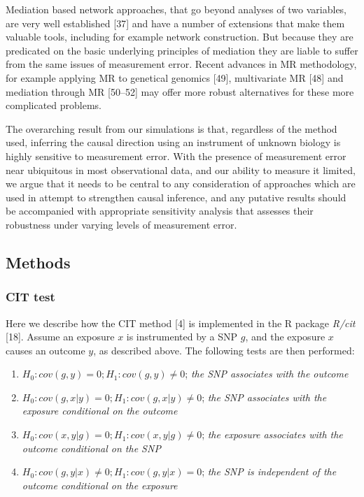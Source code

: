 \documentclass[]{article}
\providecommand{\tightlist}{%
  \setlength{\itemsep}{0pt}\setlength{\parskip}{0pt}}
\begin{document}
Mediation based network approaches, that go beyond analyses of two
variables, are very well established {[}37{]} and have a number of
extensions that make them valuable tools, including for example network
construction. But because they are predicated on the basic underlying
principles of mediation they are liable to suffer from the same issues
of measurement error. Recent advances in MR methodology, for example
applying MR to genetical genomics {[}49{]}, multivariate MR {[}48{]} and
mediation through MR {[}50--52{]} may offer more robust alternatives for
these more complicated problems.

The overarching result from our simulations is that, regardless of the
method used, inferring the causal direction using an instrument of
unknown biology is highly sensitive to measurement error. With the
presence of measurement error near ubiquitous in most observational
data, and our ability to measure it limited, we argue that it needs to
be central to any consideration of approaches which are used in attempt
to strengthen causal inference, and any putative results should be
accompanied with appropriate sensitivity analysis that assesses their
robustness under varying levels of measurement error.

\hypertarget{methods}{%
\subsection{Methods}\label{methods}}

\hypertarget{cit-test}{%
\subsubsection{CIT test}\label{cit-test}}

Here we describe how the CIT method {[}4{]} is implemented in the R
package \emph{R/cit} {[}18{]}. Assume an exposure \(x\) is instrumented
by a SNP \(g\), and the exposure \(x\) causes an outcome \(y\), as
described above. The following tests are then performed:

\begin{enumerate}
\def\labelenumi{\arabic{enumi}.}
\tightlist
\item
  \(H_0: cov(g, y) = 0; H_1: cov(g, y) \neq 0\); \emph{the SNP
  associates with the outcome}
\item
  \(H_0: cov(g, x|y) = 0; H_1: cov(g, x|y) \neq 0\); \emph{the SNP
  associates with the exposure conditional on the outcome}
\item
  \(H_0: cov(x, y|g) = 0; H_1: cov(x, y|g) \neq 0\); \emph{the exposure
  associates with the outcome conditional on the SNP}
\item
  \(H_0: cov(g, y|x) \neq 0; H_1: cov(g, y|x) = 0\); \emph{the SNP is
  independent of the outcome conditional on the exposure}
\end{enumerate}
\end{document}
